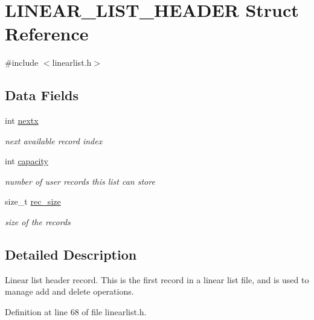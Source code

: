 \hypertarget{struct_l_i_n_e_a_r___l_i_s_t___h_e_a_d_e_r}{\section{L\-I\-N\-E\-A\-R\-\_\-\-L\-I\-S\-T\-\_\-\-H\-E\-A\-D\-E\-R Struct Reference}
\label{struct_l_i_n_e_a_r___l_i_s_t___h_e_a_d_e_r}
}


{\ttfamily \#include $<$linearlist.\-h$>$}

\subsection*{Data Fields}
\begin{DoxyCompactItemize}
\item 
int \hyperlink{struct_l_i_n_e_a_r___l_i_s_t___h_e_a_d_e_r_ae2e9d7fed40752915b807c5e6d7271ad}{nextx}
\begin{DoxyCompactList}\small\item\em next available record index \end{DoxyCompactList}\item 
int \hyperlink{struct_l_i_n_e_a_r___l_i_s_t___h_e_a_d_e_r_adbe66a087ac3fd4a5b0566f64ca2d12b}{capacity}
\begin{DoxyCompactList}\small\item\em number of user records this list can store \end{DoxyCompactList}\item 
size\-\_\-t \hyperlink{struct_l_i_n_e_a_r___l_i_s_t___h_e_a_d_e_r_a6af15626e40c23bd7d5b67f5a54c8344}{rec\-\_\-size}
\begin{DoxyCompactList}\small\item\em size of the records \end{DoxyCompactList}\end{DoxyCompactItemize}


\subsection{Detailed Description}
Linear list header record. This is the first record in a linear list file, and is used to manage add and delete operations. 

Definition at line 68 of file linearlist.\-h.




